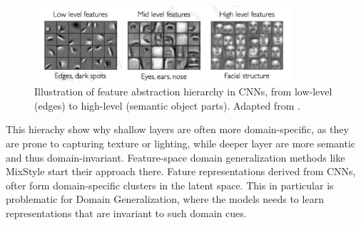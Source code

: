 \begin{figure}[ht]
    \centering
    \includegraphics[width=0.85\textwidth]{images/Learning-Feature-Representation.png}
    \caption{Illustration of feature abstraction hierarchy in CNNs, from low-level (edges) to high-level (semantic object parts). Adapted from \cite{alexanderaminiMITIntroductionDeep2025}.}
    \label{fig:Hierachy_of_Features}
\end{figure}
This hierachy show why shallow layers are often more domain-specific, as they are prone to capturing texture or lighting, while deeper layer are more semantic and thus domain-invariant. Feature-space domain generalization methods like MixStyle \cite{zhouMixStyleNeuralNetworks2023} start their approach there.
Fature representations derived from CNNs, ofter form domain-specific clusters in the latent space. This in particular is problematic for Domain Generalization, where the models needs to learn representations that are invariant to such domain cues. \cite{zhouDomainGeneralizationSurvey2022}

